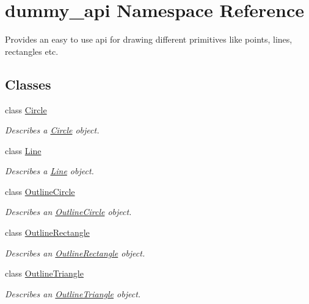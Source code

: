 \hypertarget{namespacedummy__api}{}\section{dummy\+\_\+api Namespace Reference}
\label{namespacedummy__api}


Provides an easy to use api for drawing different primitives like points, lines, rectangles etc. ~\newline
  


\subsection*{Classes}
\begin{DoxyCompactItemize}
\item 
class \mbox{\hyperlink{classdummy__api_1_1Circle}{Circle}}
\begin{DoxyCompactList}\small\item\em Describes a \mbox{\hyperlink{classdummy__api_1_1Circle}{Circle}} object. \end{DoxyCompactList}\item 
class \mbox{\hyperlink{classdummy__api_1_1Line}{Line}}
\begin{DoxyCompactList}\small\item\em Describes a \mbox{\hyperlink{classdummy__api_1_1Line}{Line}} object. \end{DoxyCompactList}\item 
class \mbox{\hyperlink{classdummy__api_1_1OutlineCircle}{Outline\+Circle}}
\begin{DoxyCompactList}\small\item\em Describes an \mbox{\hyperlink{classdummy__api_1_1OutlineCircle}{Outline\+Circle}} object. \end{DoxyCompactList}\item 
class \mbox{\hyperlink{classdummy__api_1_1OutlineRectangle}{Outline\+Rectangle}}
\begin{DoxyCompactList}\small\item\em Describes an \mbox{\hyperlink{classdummy__api_1_1OutlineRectangle}{Outline\+Rectangle}} object. \end{DoxyCompactList}\item 
class \mbox{\hyperlink{classdummy__api_1_1OutlineTriangle}{Outline\+Triangle}}
\begin{DoxyCompactList}\small\item\em Describes an \mbox{\hyperlink{classdummy__api_1_1OutlineTriangle}{Outline\+Triangle}} object. \end{DoxyCompactList}\item 

\end{DoxyCompactItemize}
